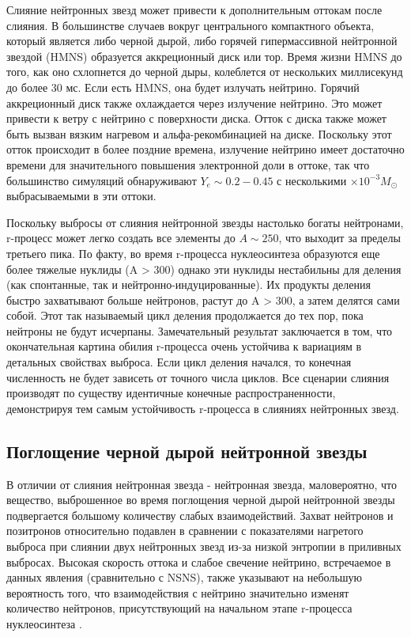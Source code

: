 \documentclass[14pt, a4paper]{article}
\numberwithin{figure}{section}
\numberwithin{equation}{section}
\begin{document}
Слияние нейтронных звезд может привести к дополнительным оттокам после слияния. В большинстве случаев вокруг центрального компактного объекта, который является либо черной дырой, либо горячей гипермассивной нейтронной звездой (HMNS) образуется аккреционный диск или тор. Время жизни HMNS до того, как оно схлопнется до черной дыры, колеблется от нескольких миллисекунд до более 30 мс. Если есть HMNS, она будет излучать нейтрино. Горячий аккреционный диск также охлаждается через излучение нейтрино. Это может привести к ветру с нейтрино с поверхности диска. Отток с диска также может быть вызван вязким нагревом и альфа-рекомбинацией на диске. Поскольку этот отток происходит в более поздние времена, излучение нейтрино имеет достаточно времени для значительного повышения электронной доли в оттоке, так что большинство симуляций обнаруживают $Y_e \sim 0. 2 - 0.45$ с несколькими $\times 10^{-3} M_\odot$ выбрасываемыми в эти оттоки.

Поскольку выбросы от слияния нейтронной звезды настолько богаты нейтронами,  r-процесс может легко создать все элементы до $A \sim 250$, что выходит за пределы третьего пика. По факту, во время r-процесса нуклеосинтеза образуются еще более тяжелые нуклиды (A > 300) однако эти нуклиды нестабильны для деления (как спонтанные, так и нейтронно-индуцированные). Их продукты деления быстро захватывают больше нейтронов, растут до A > 300, а затем делятся сами собой. Этот так называемый цикл деления продолжается до тех пор, пока нейтроны не будут исчерпаны. Замечательный результат заключается в том, что окончательная картина обилия r-процесса очень устойчива к вариациям в детальных свойствах выброса. Если цикл деления начался, то конечная численность не будет зависеть от точного числа циклов. Все сценарии слияния производят по существу идентичные конечные распространенности, демонстрируя тем самым устойчивость r-процесса в слияниях нейтронных звезд.

\subsection{Поглощение черной дырой нейтронной звезды}

В отличии от слияния нейтронная звезда - нейтронная звезда, маловероятно, что вещество, выброшенное во время поглощения черной дырой нейтронной звезды подвергается большому количеству слабых взаимодействий. Захват нейтронов и позитронов относительно подавлен в сравнении с показателями нагретого выброса при слиянии двух нейтронных звезд из-за низкой энтропии в приливных выбросах. Высокая скорость оттока и слабое свечение нейтрино, встречаемое в данных явления (сравнительно с NSNS), также указывают на небольшую вероятность того, что взаимодействия с нейтрино значительно изменят количество нейтронов, присутствующий на начальном этапе r-процесса ну\-кле\-о\-син\-те\-за \cite{bhns1}.
\end{document}
